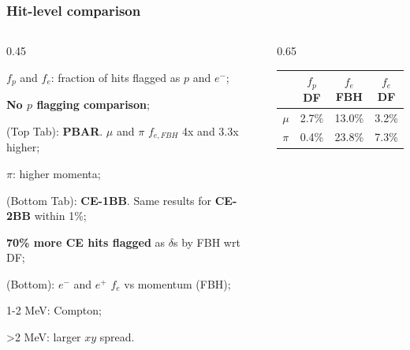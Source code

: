 \documentclass{beamer}
\begin{document}
\begin{frame}
    \frametitle{Hit-level comparison}
    \vspace{-3mm}
    \begin{columns}
    \begin{column}{0.45\framewidth}
        \setlength{\leftmargini}{0.7em}
\begin{itemize}
{\footnotesize
    \item $f_p$ and $f_e$: fraction of hits flagged as $p$ and $e^-$;
    \vspace{2mm}
    \item \textbf{No $p$ flagging comparison};
    \vspace{2mm}
    \item (Top Tab): \textbf{PBAR}. $\mu$ and $\pi$ $f_{e,FBH}$ 4x and 3.3x higher;
    \vspace{2mm}
      \item $\pi$: higher momenta;
      \vspace{2mm}
      \item (Bottom Tab): \textbf{CE-1BB}. Same results for \textbf{CE-2BB} within 1\%;
      \vspace{2mm}
      \item \textbf{70\% more CE hits flagged} as $\delta$s by FBH wrt DF;
      \vspace{2mm}
      \item (Bottom): $e^-$ and $e^+$ $f_e$ vs momentum (FBH);
      \vspace{2mm}
      \item 1-2 MeV: Compton;
      \vspace{2mm}
      \item >2 MeV: larger $xy$ spread.
    }
\end{itemize}
        \end{column}
         \begin{column}{0.65\framewidth}
        \begin{table}[h!]
        \centering
        \hspace*{-0.5em}
        \renewcommand{\arraystretch}{0.7}
        \begin{tabular}{| c | c | c | c|} 
        \hline
         &  {\scriptsize $f_{p}$ DF} &  {\scriptsize $f_{e}$ FBH} & {\scriptsize $f_{e}$ DF}\\
        \hline
        {\scriptsize $\mu$} &  {\scriptsize 2.7\%}  & {\scriptsize 13.0\%} & {\scriptsize 3.2\%}\\
        \hline
        {\scriptsize $\pi$} & {\scriptsize 0.4\%} & {\scriptsize 23.8\%} & {\scriptsize 7.3\%} \\
        \hline
        \end{tabular}
        \label{tab:0bbpbar}
        

\end{table}
\end{column}
\end{columns}
\end{frame}
\end{document}
